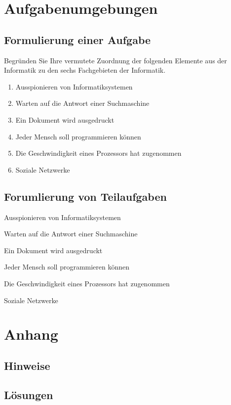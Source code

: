 \documentclass[a4paper]{schuleit}
\begin{document}
 \chapter{Aufgabenumgebungen}
 \section{Formulierung einer Aufgabe}
   \begin{Aufgabe}
			 Begründen Sie Ihre vermutete Zuordnung der folgenden 
			 Elemente aus der Informatik zu den sechs Fachgebieten 
			 der Informatik.
    \begin{enumerate}
		 \item Ausspionieren von Informatiksystemen  
     \item Warten auf die Antwort einer Suchmaschine
     \item Ein Dokument wird ausgedruckt
     \item Jeder Mensch soll programmieren können
     \item Die Geschwindigkeit eines Prozessors hat zugenommen
		 \item Soziale Netzwerke 
		\end{enumerate}
	 \end{Aufgabe}
 \section{Forumlierung von Teilaufgaben}
 \begin{Aufgaben}
     \item Ausspionieren von Informatiksystemen  
     \item Warten auf die Antwort einer Suchmaschine
     \item Ein Dokument wird ausgedruckt
     \item Jeder Mensch soll programmieren können
     \item Die Geschwindigkeit eines Prozessors hat zugenommen
		 \item Soziale Netzwerke 
		\end{Aufgaben}

\chapter{Anhang}
\section{Hinweise}
\hinweiszeigen
\section{Lösungen}
\loesungzeigen
\end{document}
